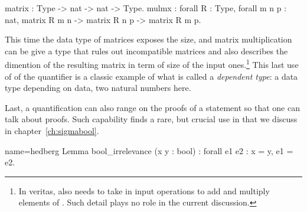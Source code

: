 \begin{coq}{}{}
matrix : Type -> nat -> nat -> Type.
mulmx : forall R : Type, forall m n p : nat,
  matrix R m n -> matrix R n p -> matrix R m p.
\end{coq}

This time the data type of matrices exposes the size, and matrix multiplication
can be give a type that rules out incompatible matrices and also describes
the dimention of the resulting matrix in term of size of the input
ones.\footnote{In veritas,  also needs to take in input operations to
add and multiply elements of .  Such detail plays no role in the current
discussion.}
This last use of of the  quantifier is a classic example
of what is called a \emph{dependent type}: a data type depending on
data, two natural numbers here.

Last, a quantification can also range on the proofs of a statement
so that one can talk about proofs.  Such capability finds a rare, but
crucial use in \mcbMC{} that we discuss in chapter~\ref{ch:sigmabool}.

\begin{coq}{name=hedberg}{}
Lemma bool_irrelevance (x y : bool) : forall e1 e2 : x = y, e1 = e2.
\end{coq}

%
%
%
%
%
%
%
%
%
